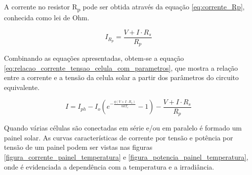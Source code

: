 A corrente no resistor R\textsubscript{p} pode ser obtida através da equação \ref{eq:corrente_Rp}, conhecida como lei de Ohm.

\begin{equation} \label{eq:corrente_Rp}
I_{R_{p}} = \frac{V+I\cdot R_{s}}{R_{p}}
\end{equation}

Combinando as equações apresentadas, obtem-se a equação \ref{eq:relacao_corrente_tensao_celula_com_parametros}, que mostra a relação entre a corrente e a tensão da celula solar a partir dos parâmetros do circuito equivalente.

\begin{equation} \label{eq:relacao_corrente_tensao_celula_com_parametros}
I = I_{ph} - I_{o}(e^{-\frac{q(V+I\cdot R_{s})}{nkT_{c}}}-1) - \frac{V+I\cdot R_{s}}{R_{p}}
\end{equation}

Quando várias células são conectadas em série e/ou em paralelo é formado um painel solar. As curvas características de corrente por tensão e potência por tensão de um painel podem ser vistas nas figuras \ref{figura_corrente_painel_temperatura} e \ref{figura_potencia_painel_temperatura}, onde é evidenciada a dependência com a temperatura e a irradiância. 

\solarPanelCharacteristicsMinusTwentyFive
{}\solarPanelCharacteristicsZero
{}\solarPanelCharacteristicsTwentyFive
{}\solarPanelCharacteristicsFifty


